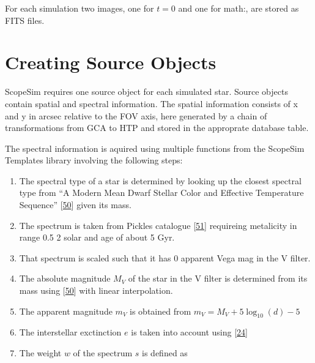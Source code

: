 \documentclass[letterpaper,10pt,english]{sphinxmanual}
\begin{document}
\sphinxAtStartPar
For each simulation two images, one for \(t=0\) and one for math:, are stored as FITS files.


\section{Creating Source Objects}
\label{\detokenize{NBodySimulation/MockObservations:creating-source-objects}}
\sphinxAtStartPar
ScopeSim requires one source object for each simulated star. Source objects contain spatial and spectral information.
The spatial information consists of x and y in arcsec relative to the FOV axis, here generated by a chain of transformations from GCA to HTP and stored in the approprate database table.

\sphinxAtStartPar
The spectral information is aquired using multiple functions from the ScopeSim Templates library involving the following steps:
\begin{enumerate}
%
\item {} 
\sphinxAtStartPar
The spectral type of a star is determined by looking up the closest spectral type from “A Modern Mean Dwarf Stellar Color and Effective Temperature Sequence” {[}\hyperlink{cite.NBodySimulation/Appendix:id51}{50}{]} given its mass.

\item {} 
\sphinxAtStartPar
The spectrum is taken from Pickles catalogue {[}\hyperlink{cite.NBodySimulation/Appendix:id52}{51}{]} requireing metalicity in range 0.5 \sphinxhyphen{} 2 solar and age of about 5 Gyr.

\item {} 
\sphinxAtStartPar
That spectrum is scaled such that it has 0 apparent Vega mag in the V filter.

\item {} 
\sphinxAtStartPar
The absolute magnitude \(M_V\) of the star in the V filter is determined from its mass using {[}\hyperlink{cite.NBodySimulation/Appendix:id51}{50}{]} with linear interpolation.

\item {} 
\sphinxAtStartPar
The apparent magnitude \(m_V\) is obtained from \(m_V = M_V + 5\log_{10}\left ( d \right )-5\)

\item {} 
\sphinxAtStartPar
The interstellar exctinction \(e\) is taken into account using {[}\hyperlink{cite.NBodySimulation/Appendix:id53}{24}{]}

\item {} 
\sphinxAtStartPar
The weight \(w\) of the spectrum \(s\) is defined as

\end{enumerate}
\end{document}
